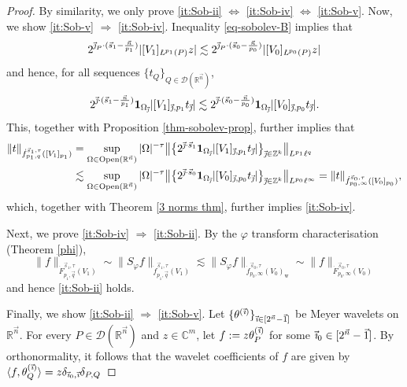 \documentclass[11pt, reqno]{amsart}
\theoremstyle{definition}
\theoremstyle{remark}
\numberwithin{equation}{section}
\newcommand{\R}{\mathbb R}
\newcommand{\vi}{\vec{\textit{\i}}}
\newcommand{\vj}{\vec{\textit{\j}}}
\newcommand{\vn}{\vec n}
\newcommand{\vq}{\vec q}
\newcommand{\aveL}{\textit{\L}}
\newcommand{\pair}[2]{\langle #1, #2 \rangle}
\newcommand{\Norm}[2]{\|#1\|_{#2}}
\newcommand{\Open}{\mathrm{Open}}
\begin{document}
\begin{proof}
By similarity, we only prove \eqref{it:Sob-ii} $\Longleftrightarrow$ \eqref{it:Sob-iv} $\Longleftrightarrow$ \eqref{it:Sob-v}.
Now, we show \eqref{it:Sob-v} $\Longrightarrow$ \eqref{it:Sob-iv}.
Inequality \eqref{eq-sobolev-B} implies that
$$
2^{\vj_P \cdot (\vec s_1-\frac{\vec n}{p_1})}
|[V_1]_{\aveL^{p_1}(P)}z|
\lesssim 2^{\vj_P \cdot (\vec s_0-\frac{\vec n}{p_0})}
|[V_0]_{\aveL^{p_0}(P)}z|
$$
and hence, for all sequences $\{t_Q\}_{Q\in\mathscr D(\R^{\vn})}$,
$$
2^{\vj \cdot (\vec s_1-\frac{\vec n}{p_1})}
\mathbf 1_{\Omega_{\vj}}|[V_1]_{\vj,p_1} t_{\vj}|
\lesssim 2^{\vj \cdot (\vec s_0-\frac{\vec n}{p_0})}
\mathbf 1_{\Omega_{\vj}}|[V_0]_{\vj,p_0} t_{\vj}|.
$$
This, together with Proposition \ref{thm-sobolev-prop},
further implies that
\begin{align*}
\|t\|_{\dot{f}_{p_1,q}^{\vec s_1,\tau}([V_1]_{p_1})}
&=\sup_{\Omega\in\Open(\R^{\vn})} |\Omega|^{-\tau}
\big\|\big\{2^{\vj\cdot \vec s_1} \mathbf 1_{\Omega_{\vj}}|[V_1]_{\vj,p_1} t_{\vj}|\big\}_{\vj \in\mathbb Z^k}\big\|_{L^{p_1}\ell^q} \\
&\lesssim \sup_{\Omega\in\Open(\R^{\vn})} |\Omega|^{-\tau}
\big\|\big\{2^{\vj\cdot \vec s_0} \mathbf 1_{\Omega_{\vj}}|[V_0]_{\vj,p_0} t_{\vj}|\big\}_{\vj \in\mathbb Z^k}\big\|_{L^{p_0}\ell^\infty}
=\|t\|_{\dot{f}_{p_0,\infty}^{\vec s_0,\tau}([V_0]_{p_0})},
\end{align*}
which, together with Theorem \ref{3 norms thm}, further implies \eqref{it:Sob-iv}.

Next, we prove \eqref{it:Sob-iv} $\Longrightarrow$ \eqref{it:Sob-ii}.
By the $\varphi$ transform characterisation (Theorem \ref{phi}),
\begin{equation*}
  \|f\|_{\dot{F}_{p_1,\vq}^{\vec s_1,\tau}(V_1)}
  \sim\Norm{S_\varphi f}{\dot f_{p_1,\vq}^{\vec s_1,\tau}(V_1)}
  \lesssim \Norm{S_\varphi f}{\dot{f}_{p_0,\infty}^{\vec s_0,\tau}(V_0)_{\mathrm w}}
  \sim \|f\|_{\dot{F}_{p_0,\infty}^{\vec s_0,\tau}(V_0)}
\end{equation*}
and hence \eqref{it:Sob-ii} holds.

Finally, we show \eqref{it:Sob-ii} $\Longrightarrow$ \eqref{it:Sob-v}. Let $\{\theta^{(\vi)}\}_{\vi\in[2^{\vn}-\vec1]}$ be Meyer wavelets on $\R^{\vn}$.
For every $P\in\mathscr D(\mathbb R^{\vec n})$ and $z\in\mathbb{C}^{m}$,
let $f:=z\theta_P^{(\vi)}$
for some $\vi_0\in[2^{\vn}-\vec1]$.
By orthonormality, it follows that the wavelet coefficients of $f$ are given by $\pair{f}{\theta_Q^{(\vi)}}=z\delta_{\vi_0,\vi}\delta_{P,Q}$


\end{proof}
\end{document}
